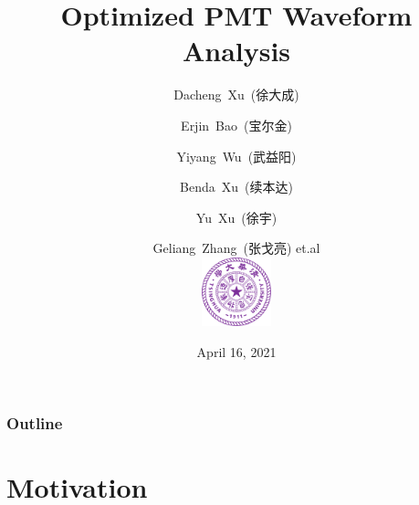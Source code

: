 \documentclass{beamer}
\title[Waveform Analysis]{Optimized PMT Waveform Analysis}
\date[JUNO]{April 16, 2021}
\begin{document}
\begin{CJK*}{UTF8}{gbsn}
\author[Dacheng Xu]{Dacheng~Xu~(徐大成) \and Erjin~Bao~(宝尔金) \and Yiyang~Wu~(武益阳) \and Benda~Xu~(续本达) \and Yu~Xu~(徐宇) \and Geliang~Zhang~(张戈亮) et.al \\ [4mm] \includegraphics[height=2cm]{img/Tsinghua_University_Logo.png}}

\frame{\titlepage}

\begin{frame}[noframenumbering]
\frametitle{Outline}
\thispagestyle{empty}
\tableofcontents
\end{frame}

\section{Motivation}


\end{CJK*}
\end{document}
